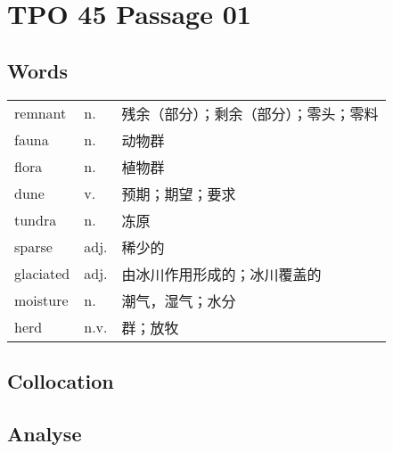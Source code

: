 \section{TPO 45 Passage 01}

\subsection{Words}

\begin{tabular}{lll}
    remnant   & n.   & 残余（部分）；剩余（部分）；零头；零料 \\
    fauna     & n.   & 动物群                 \\
    flora     & n.   & 植物群                 \\
    dune      & v.   & 预期；期望；要求            \\
    tundra    & n.   & 冻原                  \\
    sparse    & adj. & 稀少的                 \\
    glaciated & adj. & 由冰川作用形成的；冰川覆盖的      \\
    moisture  & n.   & 潮气，湿气；水分            \\
    herd      & n.v. & 群；放牧                \\
\end{tabular}

\subsection{Collocation}

\newpage

\subsection{Analyse}

